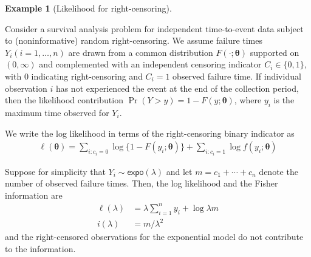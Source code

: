 \documentclass[
  11pt,
  letterpaper,
]{scrbook}
\theoremstyle{definition}
\theoremstyle{definition}
\newtheorem{example}{Example}[chapter]
\theoremstyle{definition}
\theoremstyle{plain}
\theoremstyle{plain}
\theoremstyle{remark}
\begin{document}
\begin{example}[Likelihood for
right-censoring]\protect\hypertarget{exm-likelihood-survival}{}\label{exm-likelihood-survival}

Consider a survival analysis problem for independent time-to-event data
subject to (noninformative) random right-censoring. We assume failure
times \(Y_i (i=1, \ldots, n)\) are drawn from a common distribution
\(F(\cdot; \boldsymbol{\theta})\) supported on \((0, \infty)\) and
complemented with an independent censoring indicator
\(C_i \in \{0,1\}\), with \(0\) indicating right-censoring and \(C_i=1\)
observed failure time. If individual observation \(i\) has not
experienced the event at the end of the collection period, then the
likelihood contribution \(\Pr(Y > y) = 1-F(y; \boldsymbol{\theta})\),
where \(y_i\) is the maximum time observed for \(Y_i\).

We write the log likelihood in terms of the right-censoring binary
indicator as \begin{align*}
\ell(\boldsymbol{\theta}) = \sum_{i: c_i=0} \log \{1- F(y_i; \boldsymbol{\theta})\} + \sum_{i: c_i=1} \log f(y_i; \boldsymbol{\theta})
\end{align*}

Suppose for simplicity that \(Y_i \sim \mathsf{expo}(\lambda)\) and let
\(m=c_1 + \cdots + c_n\) denote the number of observed failure times.
Then, the log likelihood and the Fisher information are \begin{align*}
\ell(\lambda) &= \lambda \sum_{i=1}^n y_i + \log \lambda m\\
i(\lambda) &= m/\lambda^2
\end{align*} and the right-censored observations for the exponential
model do not contribute to the information.

\end{example}
\end{document}
